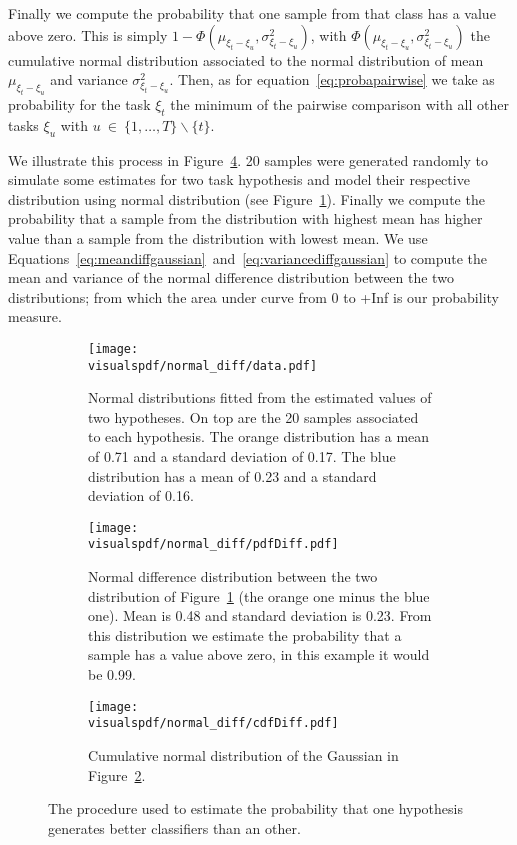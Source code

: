 Finally we compute the probability that one sample from that class has a value above zero. This is simply $1 - \Phi(\mu_{\xi_t - \xi_u}, \sigma^2_{\xi_t - \xi_u})$, with $\Phi(\mu_{\xi_t - \xi_u}, \sigma^2_{\xi_t - \xi_u})$ the cumulative normal distribution associated to the normal distribution of mean $\mu_{\xi_t - \xi_u}$ and variance $\sigma^2_{\xi_t - \xi_u}$. Then, as for equation~\ref{eq:probapairwise} we take as probability for the task  $\xi_t$ the minimum of the pairwise comparison with all other tasks $\xi_u$ with $u~\in~\{1, \ldots, T\} \smallsetminus \{t\}$.

We illustrate this process in Figure~\ref{fig:normaldifferencedistribution}. 20 samples were generated randomly to simulate some estimates for two task hypothesis and model their respective distribution using normal distribution (see Figure~\ref{fig:normaldifferencedistribution:data}). Finally we compute the probability that a sample from the distribution with highest mean has higher value than a sample from the distribution with lowest mean. We use Equations~\ref{eq:meandiffgaussian}~and~\ref{eq:variancediffgaussian} to compute the mean and variance of the normal difference distribution between the two distributions; from which the area under curve from 0 to +Inf is our probability measure.

\begin{figure}[!p]
\centering
    \begin{subfigure}[b]{\columnwidth}
        \centering
        \texttt{[image: \\visualspdf/normal\_diff/data.pdf]}
        \caption{Normal distributions fitted from the estimated values of two hypotheses. On top are the 20 samples associated to each hypothesis. The orange distribution has a mean of 0.71 and a standard deviation of 0.17. The blue distribution has a mean of 0.23 and a standard deviation of 0.16.}
        \label{fig:normaldifferencedistribution:data}
    \end{subfigure}
    \begin{subfigure}[b]{\columnwidth}
        \centering
        \texttt{[image: \\visualspdf/normal\_diff/pdfDiff.pdf]}
        \caption{Normal difference distribution between the two distribution of Figure~\ref{fig:normaldifferencedistribution:data} (the orange one minus the blue one). Mean is 0.48 and standard deviation is 0.23. From this distribution we estimate the probability that a sample has a value above zero, in this example it would be 0.99.}
        \label{fig:normaldifferencedistribution:pdf}
    \end{subfigure}
    \begin{subfigure}[b]{\columnwidth}
        \centering
        \texttt{[image: \\visualspdf/normal\_diff/cdfDiff.pdf]}
        \caption{Cumulative normal distribution of the Gaussian in Figure~\ref{fig:normaldifferencedistribution:pdf}.}
        \label{fig:normaldifferencedistribution:cdf}
    \end{subfigure}
\caption{The procedure used to estimate the probability that one hypothesis generates better classifiers than an other.}
\label{fig:normaldifferencedistribution}
\end{figure}

